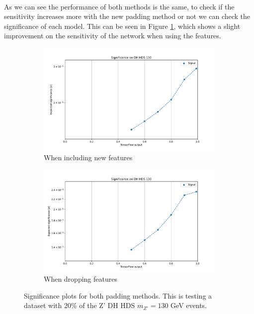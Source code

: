 \documentclass[12pt, a4paper]{book}
\begin{document}
\\As we can see the performance of both methods is the same, to check if the sensitivity increases more with the new padding method or not we can check the significance of each model. This can be seen in Figure \ref{fig:NN_pad_SIG}, which shows a slight improvement on the sensitivity of the network when using the features.
\begin{figure}[!ht]
	\centering
	\begin{subfigure}[b]{0.49\textwidth}
      \centering
      \includegraphics[width=1\textwidth]{New_pad/EXP_SIG.pdf}
      \caption{When including new features}
   \end{subfigure}
   \hfill
	\begin{subfigure}[b]{0.49\textwidth}
      \centering
      \includegraphics[width=1\textwidth]{No_pad/EXP_SIG.pdf}
      \caption{When dropping features}
   \end{subfigure}
   \caption[Significance plots for both padding methods]{Significance plots for both padding methods.  This is testing a dataset with 20\% of the Z' DH HDS $m_{Z'}=130$ GeV events.}\label{fig:NN_pad_SIG}
\end{figure}
\clearpage
\end{document}
